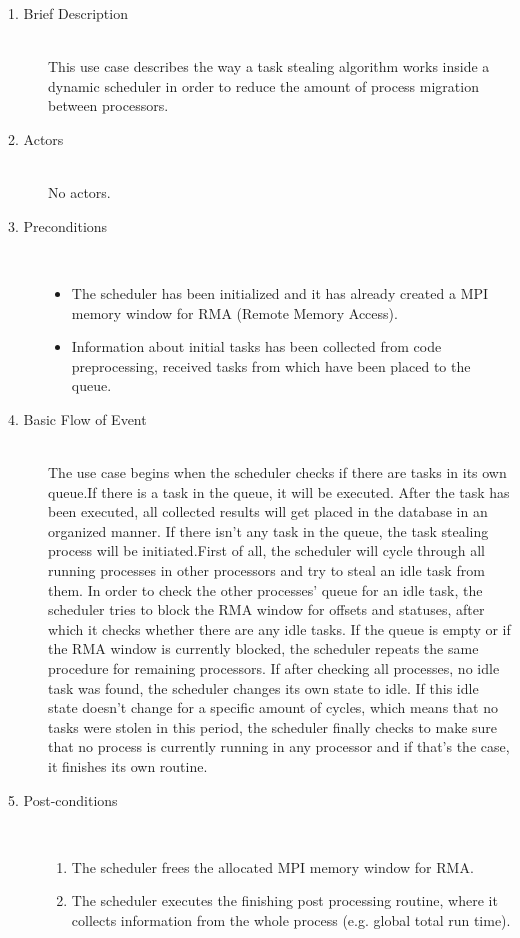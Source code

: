 \begin{description}
\item [1. Brief Description]\hfill \\
This use case describes the way a task stealing algorithm works inside a dynamic scheduler in order to reduce the amount of process migration between processors.

\item [2. Actors]\hfill \\
No actors. 


\item [3. Preconditions]\hfill \\
\vspace{-6.5mm}
\begin{itemize}
\item The scheduler has been initialized and it has already created a MPI memory window for RMA (Remote Memory Access).
\item Information about initial tasks has been collected from code preprocessing, received tasks from which have been placed to the queue.
\end{itemize}

\item [4. Basic Flow of Event]\hfill \\
The use case begins when the scheduler checks if there are tasks in its own queue.If there is a task in the queue, it will be executed. After the task has been executed, all collected results will get placed in the database in an organized manner.
If there isn't any task in the queue, the task stealing process will be initiated.\newline First of all, the scheduler will cycle through all running processes in other processors and try to steal an idle task from them. In order to check the other processes' queue for an idle task, the scheduler tries to block the RMA window for offsets and statuses, after which it checks whether there are any idle tasks. If the queue is empty or if the RMA window is currently blocked, the scheduler repeats the same procedure for remaining processors. If after checking all processes, no idle task was found, the scheduler changes its own state to idle. If this idle state doesn't change for a specific amount of cycles, which means that no tasks were stolen in this period, the scheduler finally checks to make sure that no process is currently running in any processor and if that's the case, it finishes its own routine. 


\item [5. Post-conditions]\hfill \\
\vspace{-6.5mm}
\begin{enumerate}
\item The scheduler frees the allocated MPI memory window for RMA.
\item The scheduler executes the finishing post processing routine, where it collects information from the whole process (e.g. global total run time).
\end{enumerate}


\end{description}
